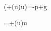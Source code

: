 \rho\left(+(\mathbf u\cdot\nabla)\mathbf u\right)=-\nabla p+\rho\mathbf g

=+(\mathbf u\cdot\nabla)\mathbf u
